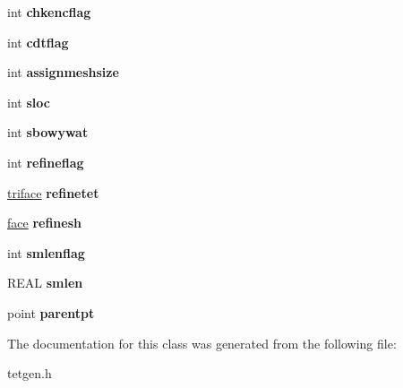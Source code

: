 \begin{DoxyCompactItemize}
int {\bfseries chkencflag}
\item 
\mbox{\label{classtetgenmesh_1_1insertvertexflags_a165eefd6dd465126f294084ef86a7a99}} 
int {\bfseries cdtflag}
\item 
\mbox{\label{classtetgenmesh_1_1insertvertexflags_a1b944691a06ca5b9d27c9690732cea4a}} 
int {\bfseries assignmeshsize}
\item 
\mbox{\label{classtetgenmesh_1_1insertvertexflags_abe0f4992169d636639d0f389a674a68f}} 
int {\bfseries sloc}
\item 
\mbox{\label{classtetgenmesh_1_1insertvertexflags_a9d380c4151120f6d0008ee61a0f410d3}} 
int {\bfseries sbowywat}
\item 
\mbox{\label{classtetgenmesh_1_1insertvertexflags_a13e91034cabc919adca3823de54de22d}} 
int {\bfseries refineflag}
\item 
\mbox{\label{classtetgenmesh_1_1insertvertexflags_ae8de017a73bd8cd9b6de4f67ae89e2c8}} 
\hyperlink{classtetgenmesh_1_1triface}{triface} {\bfseries refinetet}
\item 
\mbox{\label{classtetgenmesh_1_1insertvertexflags_a5caa7334d56feac9a16021de6b8e2bea}} 
\hyperlink{classtetgenmesh_1_1face}{face} {\bfseries refinesh}
\item 
\mbox{\label{classtetgenmesh_1_1insertvertexflags_a3d626a15b8c3ed228ad1cf85e918f169}} 
int {\bfseries smlenflag}
\item 
\mbox{\label{classtetgenmesh_1_1insertvertexflags_aecaa1f8da0c8c7d073a4f3c0fbf1df56}} 
R\+E\+AL {\bfseries smlen}
\item 
\mbox{\label{classtetgenmesh_1_1insertvertexflags_a7b72ad9649e1b63ed22bbf70e9b9d41a}} 
point {\bfseries parentpt}
\end{DoxyCompactItemize}


The documentation for this class was generated from the following file\+:\begin{DoxyCompactItemize}
\item 
tetgen.\+h\end{DoxyCompactItemize}
